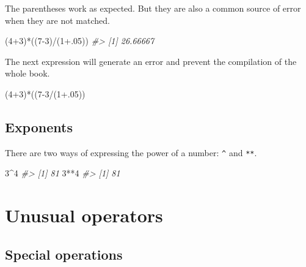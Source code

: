 \documentclass[]{book}
\newenvironment{Shaded}{}{}
\newcommand{\CommentTok}[1]{\textcolor[rgb]{0.38,0.63,0.69}{\textit{#1}}}
\newcommand{\DecValTok}[1]{\textcolor[rgb]{0.25,0.63,0.44}{#1}}
\newcommand{\FloatTok}[1]{\textcolor[rgb]{0.25,0.63,0.44}{#1}}
\newcommand{\NormalTok}[1]{#1}
\newcommand{\OperatorTok}[1]{\textcolor[rgb]{0.40,0.40,0.40}{#1}}
\theoremstyle{definition}
\theoremstyle{definition}
\theoremstyle{definition}
\theoremstyle{remark}
\begin{document}
The parentheses work as expected. But they are also a common source of
error when they are not matched.

\begin{Shaded}
\begin{Highlighting}[]
\NormalTok{(}\DecValTok{4}\OperatorTok{+}\DecValTok{3}\NormalTok{)}\OperatorTok{*}\NormalTok{((}\DecValTok{7-3}\NormalTok{)}\OperatorTok{/}\NormalTok{(}\DecValTok{1}\FloatTok{+.05}\NormalTok{))}
\CommentTok{#> [1] 26.66667}
\end{Highlighting}
\end{Shaded}

The next expression will generate an error and prevent the compilation
of the whole book.

\begin{Shaded}
\begin{Highlighting}[]
\NormalTok{(}\DecValTok{4}\OperatorTok{+}\DecValTok{3}\NormalTok{)}\OperatorTok{*}\NormalTok{((}\DecValTok{7-3}\OperatorTok{/}\NormalTok{(}\DecValTok{1}\FloatTok{+.05}\NormalTok{))}
\end{Highlighting}
\end{Shaded}

\hypertarget{exponents}{%
\subsection{Exponents}\label{exponents}}

There are two ways of expressing the power of a number: \texttt{\^{}}
and \texttt{**}.

\begin{Shaded}
\begin{Highlighting}[]
\DecValTok{3}\OperatorTok{^}\DecValTok{4}
\CommentTok{#> [1] 81}
\DecValTok{3}\OperatorTok{**}\DecValTok{4}
\CommentTok{#> [1] 81}
\end{Highlighting}
\end{Shaded}

\hypertarget{unusual-operators}{%
\section{Unusual operators}\label{unusual-operators}}

\hypertarget{special-operations}{%
\subsection{Special operations}\label{special-operations}}
\end{document}
